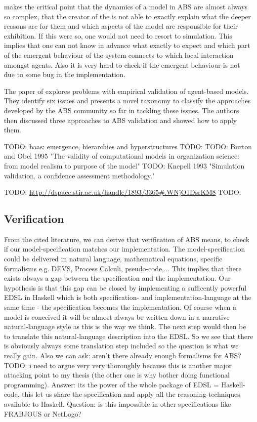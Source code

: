 \cite{galan_errors_2009} makes the critical point that the dynamics of a model in ABS are almost always so complex, that the creator of the is not able to exactly explain what the deeper reasons are for them and which aspects of the model are responsible for their exhibition. If this were so, one would not need to resort to simulation. This implies that one can not know in advance what exactly to expect and which part of the emergent behaviour of the system connects to which local interaction amongst agents. Also it is very hard to check if the emergent behaviour is not due to some bug in the implementation.

The paper of \cite{windrum_empirical_2007} explores problems with empirical validation of agent-based models. They identify six issues and presents a novel taxonomy to classify the approaches developed by the ABS community so far in tackling these issues. The authors then discussed three approaches to ABS validation and showed how to apply them.




TODO: baas: emergence, hierarchies and hyperstructures
TODO: \cite{baas_emergence_1997}
TODO: Burton and Obel 1995 "The validity of computational models in organization science: from model realism to purpose of the model"
TODO: Knepell 1993 "Simulation validation, a confidence assessment methodology."

TODO: \url{http://dspace.stir.ac.uk/handle/1893/3365#.WNjO1DsrKM8}
TODO: \cite{klugl_amason:_2013}

\subsection{Verification}
From the cited literature, we can derive that verification of ABS means, to check if our model-specification matches our implementation. The model-specification could be delivered in natural language, mathematical equations, specific formalisms e.g. DEVS, Process Calculi, pseudo-code,... This implies that there exists always a gap between the specification and the implementation. Our hypothesis is that this gap can be closed by implementing a sufficently powerful EDSL in Haskell which is both specification- and implementation-language at the same time - the specification becomes the implementation. Of course when a model is conceived it will be almost always be written down in a narrative natural-language style as this is the way we think. The next step would then be to translate this natural-language description into the EDSL. So we see that there is obviously always some translation step included so the question is what we really gain. Also we can ask: aren't there already enough formalisms for ABS? TODO: i need to argue very very thoroughly because this is another major attacking point to my thesis (the other one is why bother doing functional programming).
Answer: its the power of the whole package of EDSL = Haskell-code. this let us share the specification and apply all the reasoning-techniques available to Haskell. Question: is this impossible in other specifications like FRABJOUS or NetLogo?

